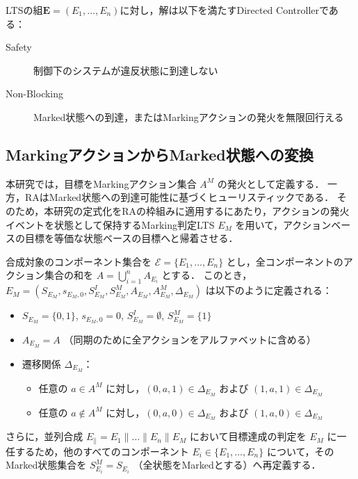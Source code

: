 \documentclass[a4paper,11pt,oneside,openany,report,dvipdfmx]{jsbook}
\begin{document}
\begin{definition}
  LTSの組$\bm{E}=(E_1,\ldots,E_n)$に対し，解は以下を満たすDirected Controllerである：
  \begin{description}
    \item[Safety]
          制御下のシステムが違反状態に到達しない
    \item[Non-Blocking]
          Marked状態への到達，またはMarkingアクションの発火を無限回行える
  \end{description}
\end{definition}

\subsection{MarkingアクションからMarked状態への変換}
\label{subsec:marking_to_marked}

本研究では，目標をMarkingアクション集合 $A^M$ の発火として定義する．
一方，RAはMarked状態への到達可能性に基づくヒューリスティックである．
そのため，本研究の定式化をRAの枠組みに適用するにあたり，アクションの発火イベントを状態として保持するMarking判定LTS $E_M$ を用いて，アクションベースの目標を等価な状態ベースの目標へと帰着させる．

合成対象のコンポーネント集合を $\mathcal{E} = \{E_1, \dots, E_n\}$ とし，全コンポーネントのアクション集合の和を $A = \bigcup_{i=1}^n A_{E_i}$ とする．
このとき，$E_M = (S_{E_M}, s_{E_M,0}, S^I_{E_M}, S^M_{E_M}, A_{E_M}, A^M_{E_M}, \Delta_{E_M})$ は以下のように定義される：

\begin{itemize}
  \item $S_{E_M} = \{0, 1\}$, $s_{E_M,0} = 0$, $S^I_{E_M} = \emptyset$, $S^M_{E_M} = \{1\}$
  \item $A_{E_M} = A$ （同期のために全アクションをアルファベットに含める）
  \item 遷移関係 $\Delta_{E_M}$：
        \begin{itemize}
          \item 任意の $a \in A^M$ に対し，$(0, a, 1) \in \Delta_{E_M}$ および $(1, a, 1) \in \Delta_{E_M}$
          \item 任意の $a \notin A^M$ に対し，$(0, a, 0) \in \Delta_{E_M}$ および $(1, a, 0) \in \Delta_{E_M}$
        \end{itemize}
\end{itemize}

さらに，並列合成 $E_\parallel = E_1 \parallel \dots \parallel E_n \parallel E_M$ において目標達成の判定を $E_M$ に一任するため，他のすべてのコンポーネント $E_i \in \{E_1, \dots, E_n\}$ について，そのMarked状態集合を $S^M_{E_i} = S_{E_i}$ （全状態をMarkedとする）へ再定義する．
\end{document}
